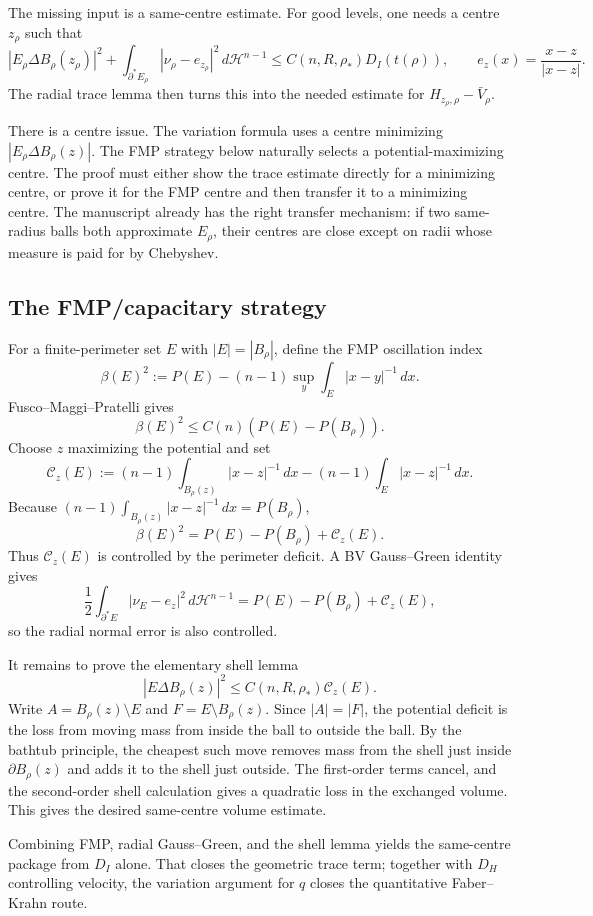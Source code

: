 \documentclass[10pt]{article}
\newcommand{\Hh}{\mathcal H}
\newcommand{\Per}{P}
\begin{document}
The missing input is a same-centre estimate. For good levels, one needs a centre $z_\rho$ such that
\[
|E_\rho\Delta B_\rho(z_\rho)|^2+
\int_{\partial^*E_\rho}|\nu_\rho-e_{z_\rho}|^2\,d\Hh^{n-1}
\le C(n,R,\rho_*)D_I(t(\rho)),
\qquad e_z(x)=\frac{x-z}{|x-z|}.
\]
The radial trace lemma then turns this into the needed estimate for
$H_{z_\rho,\rho}-\bar V_\rho$.

There is a centre issue. The variation formula uses a centre minimizing $|E_\rho\Delta B_\rho(z)|$. The FMP strategy below naturally selects a potential-maximizing centre. The proof must either show the trace estimate directly for a minimizing centre, or prove it for the FMP centre and then transfer it to a minimizing centre. The manuscript already has the right transfer mechanism: if two same-radius balls both approximate $E_\rho$, their centres are close except on radii whose measure is paid for by Chebyshev.

\subsection*{The FMP/capacitary strategy}

For a finite-perimeter set $E$ with $|E|=|B_\rho|$, define the FMP oscillation index
\[
   \beta(E)^2:=\Per(E)-(n-1)\sup_y\int_E |x-y|^{-1}\,dx.
\]
Fusco--Maggi--Pratelli gives
\[
   \beta(E)^2\le C(n)(\Per(E)-\Per(B_\rho)).
\]
Choose $z$ maximizing the potential and set
\[
\mathcal C_z(E)
:=(n-1)\int_{B_\rho(z)}|x-z|^{-1}\,dx
 -(n-1)\int_E|x-z|^{-1}\,dx.
\]
Because $(n-1)\int_{B_\rho(z)}|x-z|^{-1}\,dx=\Per(B_\rho)$,
\[
   \beta(E)^2=\Per(E)-\Per(B_\rho)+\mathcal C_z(E).
\]
Thus $\mathcal C_z(E)$ is controlled by the perimeter deficit. A BV Gauss--Green identity gives
\[
   \frac12\int_{\partial^*E}|\nu_E-e_z|^2\,d\Hh^{n-1}
   =\Per(E)-\Per(B_\rho)+\mathcal C_z(E),
\]
so the radial normal error is also controlled.

It remains to prove the elementary shell lemma
\[
   |E\Delta B_\rho(z)|^2\le C(n,R,\rho_*)\mathcal C_z(E).
\]
Write $A=B_\rho(z)\setminus E$ and $F=E\setminus B_\rho(z)$. Since $|A|=|F|$, the potential deficit is the loss from moving mass from inside the ball to outside the ball. By the bathtub principle, the cheapest such move removes mass from the shell just inside $\partial B_\rho(z)$ and adds it to the shell just outside. The first-order terms cancel, and the second-order shell calculation gives a quadratic loss in the exchanged volume. This gives the desired same-centre volume estimate.

Combining FMP, radial Gauss--Green, and the shell lemma yields the same-centre package from $D_I$ alone. That closes the geometric trace term; together with $D_H$ controlling velocity, the variation argument for $q$ closes the quantitative Faber--Krahn route.
\end{document}
